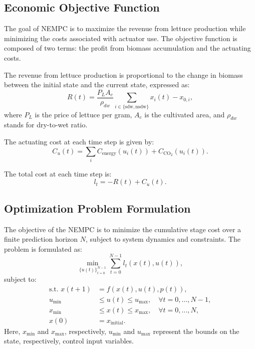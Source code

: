 \documentclass[conference]{IEEEtran}
\newcommand{\coo}{\ensuremath{\mathrm{CO_2}}}
\begin{document}
\subsection{Economic Objective Function}\label{subsec:mpc_objective}

The goal of NEMPC is to maximize the revenue from lettuce production while minimizing the costs associated with actuator use. The objective function is composed of two terms: the profit from biomass accumulation and the actuating costs.

The revenue from lettuce production is proportional to the change in biomass between the initial state and the current state, expressed as:
\begin{equation}
    R(t) = \frac{P_L A_c}{\rho_{dw}} \textstyle\sum_{i\in \{ \text{sdw}, \text{nsdw} \}}x_i(t) - x_{0, i},
\end{equation}
where \(P_L\) is the price of lettuce per gram, \(A_c\) is the cultivated area, and \(\rho_{dw}\) stands for dry-to-wet ratio.

The actuating cost at each time step is given by:
\begin{equation}
    C_u(t) = \textstyle\sum_{i} C_{\text{energy}}(u_i(t)) + C_{\coo}(u_i(t)).
\end{equation}

The total cost at each time step is:
\begin{equation}
    l_t = -R(t) + C_u(t).
\end{equation}

\subsection{Optimization Problem Formulation}

The objective of the NEMPC is to minimize the cumulative stage cost over a finite prediction horizon \(N\), subject to system dynamics and constraints. The problem is formulated as:
\begin{equation}
    \min_{{\{u(t)\}}_{t=0}^{N-1}} \sum_{t=0}^{N-1} l_t(x(t), u(t)),
\end{equation}
subject to:
\begin{align}
    \text{s.t. } x(t+1) & = f(x(t), u(t), p(t)),                                    \\
    u_{\min}            & \leq u(t) \leq u_{\max}, \quad \forall t = 0, \dots, N-1, \\
    x_{\min}            & \leq x(t) \leq x_{\max}, \quad \forall t = 0, \dots, N,   \\
    x(0)                & = x_{\text{initial}}.
\end{align}
Here, \(x_{\min}\) and \(x_{\max}\), respectively, \(u_{\min}\) and \(u_{\max}\) represent the bounds on the state, respectively, control input variables.
\end{document}
